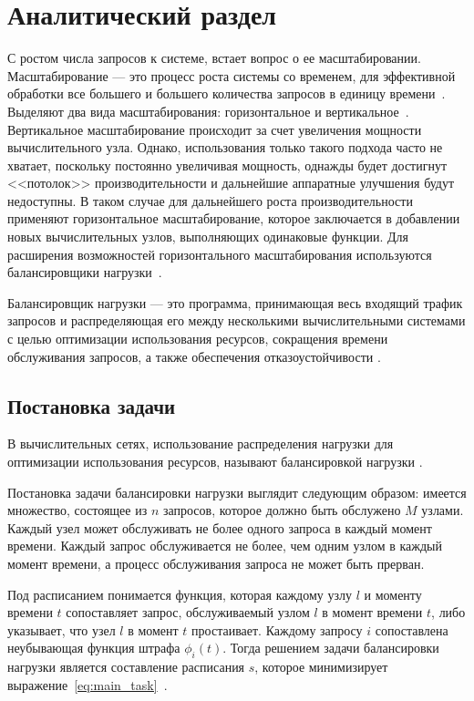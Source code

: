 

\chapter{Аналитический раздел}

С ростом числа запросов к системе, встает вопрос о ее масштабировании. Масштабирование --- это процесс роста системы со временем, для эффективной обработки все большего и большего количества запросов в единицу времени~\cite{scaling}. Выделяют два вида масштабирования: горизонтальное и вертикальное~\mbox{\cite{comp, part_algos, com_analysis}}. Вертикальное масштабирование происходит за счет увеличения мощности вычислительного узла. Однако, использования только такого подхода часто не хватает, поскольку постоянно увеличивая мощность, однажды будет достигнут <<потолок>> производительности и дальнейшие аппаратные улучшения будут недоступны. В таком случае для дальнейшего роста производительности применяют горизонтальное масштабирование, которое заключается в добавлении новых вычислительных узлов, выполняющих одинаковые функции. Для расширения возможностей горизонтального масштабирования используются балансировщики нагрузки~\cite{part_algos, comp}.

Балансировщик нагрузки --- это программа, принимающая весь
входящий трафик запросов и распределяющая его между несколькими
вычислительными системами с целью оптимизации использования
ресурсов, сокращения времени обслуживания запросов, а также
обеспечения отказоустойчивости \cite{comp}.


\section{Постановка задачи}

В вычислительных сетях, использование распределения нагрузки для оптимизации использования ресурсов, называют балансировкой нагрузки \cite{gaud}.

Постановка задачи балансировки нагрузки выглядит следующим образом: имеется множество, состоящее из $n$ запросов, которое должно быть обслужено $M$ узлами. 
Каждый узел может обслуживать не более одного запроса в каждый момент времени. Каждый запрос обслуживается не более, чем одним узлом в каждый момент времени, а процесс обслуживания запроса не может быть прерван. 

Под расписанием понимается функция, которая каждому узлу $l$ и моменту времени $t$ сопоставляет запрос, обслуживаемый узлом $l$ в момент времени $t$, либо указывает, что узел $l$ в момент $t$ простаивает. Каждому запросу $i$ сопоставлена неубывающая функция штрафа $\phi_i(t)$. Тогда решением задачи балансировки нагрузки является составление расписания $s$, которое минимизирует выражение~\eqref{eq:main_task}~\cite{gaud}.

